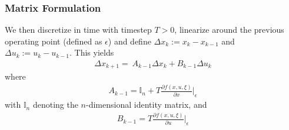 \documentclass[
    aspectratio=169,
    \ifdefined\HANDOUT
    handout
    \else
    \fi
]{beamer}
\begin{document}
\begin{frame}
    \frametitle{Matrix Formulation}
    We then discretize in time with timestep $T>0$, linearize around the previous operating point
    (defined as $\epsilon$) and
    define $\Delta x_k := x_k-x_{k-1}$ and $\Delta u_k := u_k - u_{k-1}$. This yields
    \begin{align*}
        \Delta x_{k+1} = ~ A_{k-1} \Delta x_k + B_{k-1} \Delta u_k
    \end{align*}
    where
    \begin{align*}
        A_{k-1} = \mathbb{I}_{n} + T \frac{\partial f(x,u, \xi)}{\partial x}\Big|_{\epsilon}
    \end{align*}
    with $\mathbb{I}_n$ denoting the $n$-dimensional identity matrix, and
    \begin{align*}
        B_{k-1} = T \frac{\partial f(x,u, \xi)}{\partial u}\Big|_{\epsilon}
    \end{align*}
\end{frame}
\end{document}
